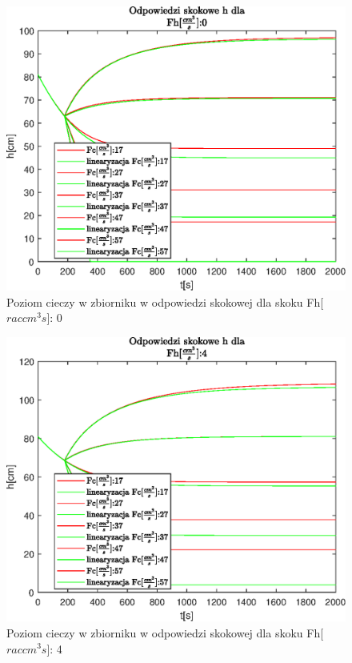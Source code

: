\begin{figure}[h!]
   \centering
   \includegraphics{img/step-responses/h/stepResponseHFh0.eps}
   \caption{Poziom cieczy w zbiorniku w odpowiedzi skokowej dla skoku Fh[$rac{cm^3}{s}$]: 0}
   \label{fig:stepResponseHFh0}
\end{figure}
            
\begin{figure}[h!]
   \centering
   \includegraphics{img/step-responses/h/stepResponseHFh4.eps}
   \caption{Poziom cieczy w zbiorniku w odpowiedzi skokowej dla skoku Fh[$rac{cm^3}{s}$]: 4}
   \label{fig:stepResponseHFh4}
\end{figure}
            
